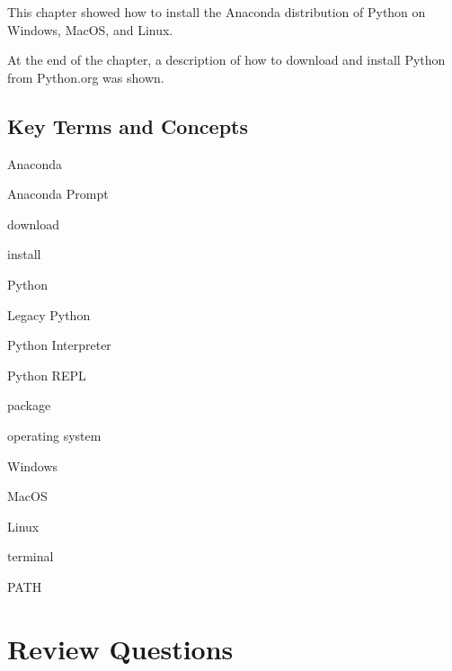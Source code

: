 \documentclass{book}
\newenvironment{key_terms}{\begin{multicols}{3}}{\end{multicols}} %
\begin{document}
This chapter showed how to install the Anaconda distribution of Python
on Windows, MacOS, and Linux.

At the end of the chapter, a description of how to download and install
Python from Python.org was shown.
    




    
        \hypertarget{key-terms-and-concepts}{%
\subsection{Key Terms and Concepts}\label{key-terms-and-concepts}}
    




    
        \begin{key_terms}
        Anaconda

Anaconda Prompt

download

install

Python

Legacy Python

Python Interpreter

Python REPL

package

operating system

Windows

MacOS

Linux

terminal

PATH
        \end{key_terms}

    




    
        \hypertarget{review-questions}{%
\section{Review Questions}\label{review-questions}}
    
\end{document}
